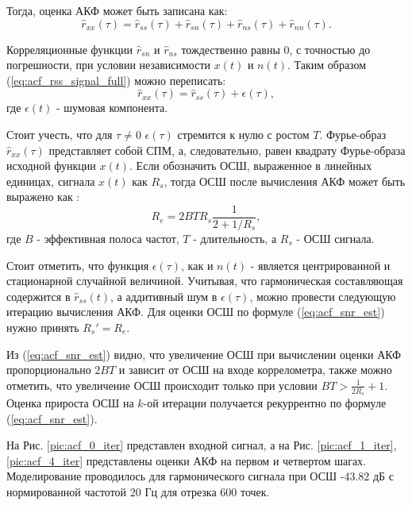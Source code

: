 Тогда, оценка АКФ может быть записана как:
\begin{equation}
	\label{eq:acf_rss_signal_full}
	\hat{r}_{xx}(\tau)=\hat{r}_{ss}(\tau)+\hat{r}_{sn}(\tau)+\hat{r}_{ns}(\tau) + \hat{r}_{nn}(\tau).
\end{equation}

Корреляционные функции ${\hat{r}_{sn}}$ и ${\hat{r}_{ns}}$ тождественно равны 0, с точностью до погрешности, при условии независимости
${x(t)}$ и ${n(t)}$. Таким образом (\ref{eq:acf_rss_signal_full}) можно переписать:
\begin{equation}
	\label{eq:acf_rss_signal_new}
	\hat{r}_{xx}(\tau) = \hat{r}_{ss}(\tau) + \epsilon (\tau),
\end{equation}
где ${\epsilon (t)}$ - шумовая компонента.

Стоит учесть, что для ${\tau \ne 0}$ ${\epsilon (\tau)}$ стремится к нулю с ростом ${T}$. Фурье-образ ${\hat{r}_{xx}(\tau)}$
представляет собой СПМ, а, следовательно, равен квадрату Фурье-образа исходной функции ${x(t)}$.
Если обозначить ОСШ, выраженное в линейных единицах, сигнала ${x(t)}$ как ${R_s}$, тогда ОСШ после вычисления АКФ может быть выражено 
как \cite{book_max}:
\begin{equation}
	\label{eq:acf_snr_est}
	R_e=2BTR_s \frac{1}{2+1/R_s},
\end{equation}
где ${B}$ - эффективная полоса частот, ${T}$ - длительность, а ${R_s}$ - ОСШ сигнала.

Стоит отметить, что функция ${\epsilon(\tau)}$, как и ${n(t)}$ - является центрированной и
стационарной случайной величиной.
Учитывая, что гармоническая составляющая содержится в ${\hat{r}_{ss}(t)}$, а аддитивный шум в ${\epsilon(\tau)}$, можно провести
следующую итерацию вычисления АКФ. Для оценки ОСШ по формуле (\ref{eq:acf_snr_est}) нужно принять ${R_s' = R_e}$.

Из (\ref{eq:acf_snr_est}) видно, что увеличение ОСШ при вычислении оценки АКФ пропорционально ${2BT}$ и зависит от
ОСШ на входе коррелометра, также можно отметить, что увеличение ОСШ происходит только при условии ${BT > \frac{1}{2R_s} + 1}$.
Оценка прироста ОСШ на ${k}$-ой итерации получается рекуррентно по формуле (\ref{eq:acf_snr_est}).

На Рис. \ref{pic:acf_0_iter} представлен входной сигнал, а на
Рис. \ref{pic:acf_1_iter}, \ref{pic:acf_4_iter} представлены оценки АКФ на первом и четвертом шагах.
Моделирование проводилось для гармонического сигнала при ОСШ -43.82 дБ с нормированной частотой 20 Гц для
отрезка 600 точек.

